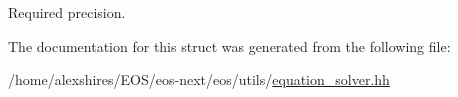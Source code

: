 Required precision. 

The documentation for this struct was generated from the following file:\begin{DoxyCompactItemize}
\item 
/home/alexshires/EOS/eos-\/next/eos/utils/\hyperlink{equation__solver_8hh}{equation\_\-solver.hh}\end{DoxyCompactItemize}
